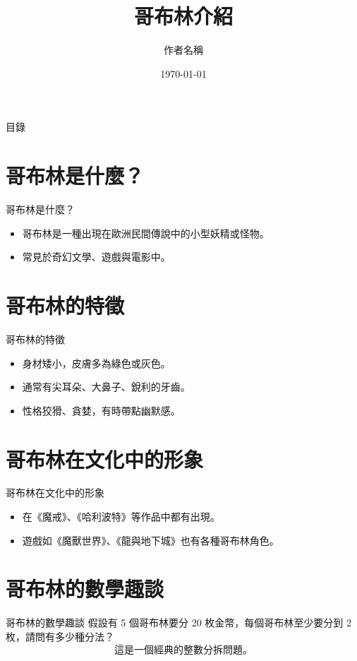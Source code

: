 \documentclass{beamer}
\title{哥布林介紹}
\author{作者名稱}
\date{\today}
\begin{document}
\begin{frame}
    \titlepage
\end{frame}

\begin{frame}{目錄}
    \tableofcontents
\end{frame}

\section{哥布林是什麼？}
\begin{frame}{哥布林是什麼？}
    \begin{itemize}
        \item 哥布林是一種出現在歐洲民間傳說中的小型妖精或怪物。
        \item 常見於奇幻文學、遊戲與電影中。
    \end{itemize}
\end{frame}

\section{哥布林的特徵}
\begin{frame}{哥布林的特徵}
    \begin{itemize}
        \item 身材矮小，皮膚多為綠色或灰色。
        \item 通常有尖耳朵、大鼻子、銳利的牙齒。
        \item 性格狡猾、貪婪，有時帶點幽默感。
    \end{itemize}
\end{frame}

\section{哥布林在文化中的形象}
\begin{frame}{哥布林在文化中的形象}
    \begin{itemize}
        \item 在《魔戒》、《哈利波特》等作品中都有出現。
        \item 遊戲如《魔獸世界》、《龍與地下城》也有各種哥布林角色。
    \end{itemize}
\end{frame}

\section{哥布林的數學趣談}
\begin{frame}{哥布林的數學趣談}
    假設有 5 個哥布林要分 20 枚金幣，每個哥布林至少要分到 2 枚，請問有多少種分法？
    \[
    \text{這是一個經典的整數分拆問題。}
    \]
\end{frame}
\end{document}
